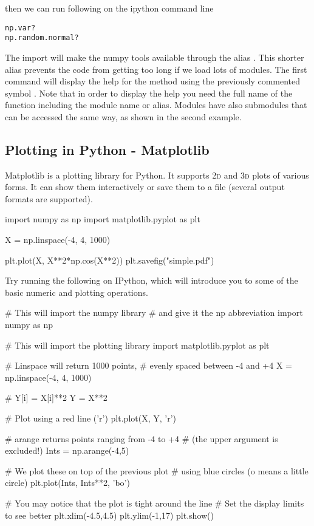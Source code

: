 then we can run following on the ipython command line

\begin{verbatim}
np.var?
np.random.normal?
\end{verbatim}

The import  will make the numpy tools available through the alias . This shorter alias prevents the code from getting too long if we load lots of modules. The first command will display the help for the method  using the previously commented symbol . Note that in order to display the help you need the full name of the function including the module name or alias. Modules have also submodules that can be accessed the same way, as shown in the second example.


\subsection{Plotting in Python - Matplotlib}

Matplotlib is a plotting library for Python. It supports \textsc{2d} and \textsc{3d} plots of various forms. It can show them interactively or save them to a file (several output formats are supported).

\begin{python}
import numpy as np
import matplotlib.pyplot as plt

X = np.linspace(-4, 4, 1000)

plt.plot(X, X**2*np.cos(X**2))
plt.savefig("simple.pdf")
\end{python}


\begin{exercise}
Try running the following on IPython, which will introduce you to some of the basic numeric and plotting operations.

\begin{python}
# This will import the numpy library
# and give it the np abbreviation
import numpy as np

# This will import the plotting library
import matplotlib.pyplot as plt

# Linspace will return 1000 points,
# evenly spaced between -4 and +4
X = np.linspace(-4, 4, 1000)

# Y[i] = X[i]**2
Y = X**2

# Plot using a red line ('r')
plt.plot(X, Y, 'r')

# arange returns points ranging from -4 to +4
# (the upper argument is excluded!)
Ints = np.arange(-4,5)

# We plot these on top of the previous plot
# using blue circles (o means a little circle)
plt.plot(Ints, Ints**2, 'bo')

# You may notice that the plot is tight around the line
# Set the display limits to see better
plt.xlim(-4.5,4.5)
plt.ylim(-1,17)
plt.show()
\end{python}
\end{exercise}

